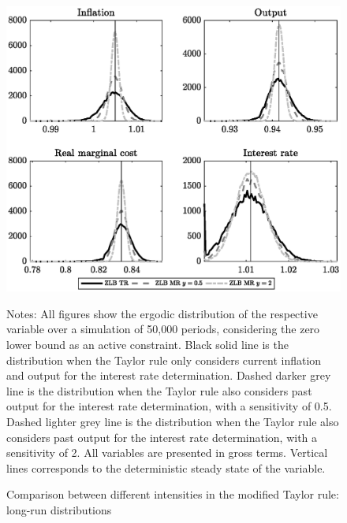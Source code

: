 \documentclass[11pt]{article}
\numberwithin{equation}{section}
\begin{document}
\begin{figure}[H]
	\centering
	\caption{Comparison between different intensities in the modified Taylor rule: long-run distributions}\label{fig:distLevel}
	\includegraphics[scale=.6]{distLevel}
	\begin{minipage}{\linewidth}
    	\vspace{1mm}
    	\footnotesize{{\sc Notes:} All figures show the ergodic distribution of the respective variable over a simulation of 50,000 periods, considering the zero lower bound as an active constraint. Black solid line is the distribution when the Taylor rule only considers current inflation and output for the interest rate determination. Dashed darker grey line is the distribution when the Taylor rule also considers past output for the interest rate determination, with a sensitivity of 0.5. Dashed lighter grey line is the distribution when the Taylor rule also considers past output for the interest rate determination, with a sensitivity of 2. All variables are presented in gross terms. Vertical lines corresponds to the deterministic steady state of the variable.}
	\end{minipage}
\end{figure}
\end{document}
